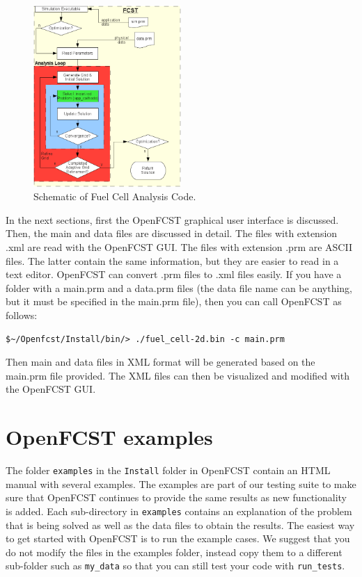 \begin{figure}[tbh]
\begin{center}
\includegraphics[width=0.5\textwidth]{figures/analysis_schematic.png}
\caption{Schematic of Fuel Cell Analysis Code.}
\label{analysis_schematic}
\end{center}
\end{figure}

In the next sections, first the OpenFCST graphical user interface is discussed. Then, the main and data files are discussed in detail. The files with extension .xml are read with the OpenFCST GUI. The files with extension .prm are ASCII files. The latter contain the same information, but they are easier to read in a text editor. OpenFCST can convert .prm files to .xml files easily. If you have a folder with a main.prm and a data.prm files (the data file name can be anything, but it must be specified in the main.prm file), then you can call OpenFCST as follows:
\begin{lstlisting}
$~/Openfcst/Install/bin/> ./fuel_cell-2d.bin -c main.prm
\end{lstlisting}
Then main and data files in XML format will be generated based on the main.prm file provided. The XML files can then be visualized and modified with the OpenFCST GUI.

\section{OpenFCST examples}

The folder \texttt{examples} in the \texttt{Install} folder in OpenFCST contain an HTML manual with several examples. The examples are part of our testing suite to make sure that OpenFCST continues to provide the same results as new functionality is added. Each sub-directory in \texttt{examples} contains an explanation of the problem that is being solved as well as the data files to obtain the results. The easiest way to get started with OpenFCST is to run the example cases. We suggest that you do not modify the files in the examples folder, instead copy them to a different sub-folder such as \texttt{my\_data} so that you can still test your code with \texttt{run\_tests}.

